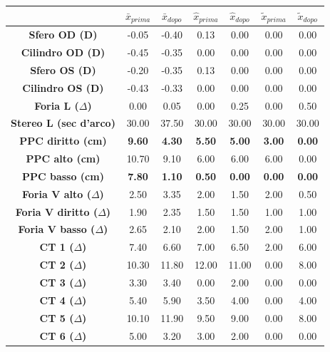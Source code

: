 \begin{table}[H]
\begin{center}
\begin{tabular}{|c|c|c|c|c|c|c|} \hline
{\textbf{}} & {\textbf{$\bar{x}_{prima}$}}} & {\textbf{$\bar{x}_{dopo}$}}& {\textbf{$\hat{x}_{prima}$}}} & {\textbf{$\hat{x}_{dopo}$}}} & {\textbf{$\tilde{x}_{prima}$}}} & {\textbf{$\tilde{x}_{dopo}$}}}\\ \hline
\textbf{Sfero OD (D)} & -0.05 & -0.40 & 0.13 & 0.00 & 0.00 & 0.00 \\ \hline
\textbf{Cilindro OD (D)} & -0.45 & -0.35 & 0.00 & 0.00 & 0.00 & 0.00 \\ \hline
\textbf{Sfero OS (D)} & -0.20 & -0.35 & 0.13 & 0.00 & 0.00 & 0.00 \\ \hline
\textbf{Cilindro OS (D)} & -0.43 & -0.33 & 0.00 & 0.00 & 0.00 & 0.00 \\ \hline
\textbf{Foria L ($\Delta$)} & 0.00 & 0.05 & 0.00 & 0.25 & 0.00 & 0.50 \\ \hline
\textbf{Stereo L (sec d'arco)} & 30.00 & 37.50 & 30.00 & 30.00 & 30.00 & 30.00 \\ \hline
\textbf{PPC diritto (cm)} & \textbf{9.60} & \textbf{4.30} & \textbf{5.50} & \textbf{5.00} & \textbf{3.00} & \textbf{0.00} \\ \hline
\textbf{PPC alto (cm)} & 10.70 & 9.10 & 6.00 & 6.00 & 6.00 & 0.00\\ \hline
\textbf{PPC basso (cm)} & \textbf{7.80} & \textbf{1.10} & \textbf{0.50} & \textbf{0.00} & \textbf{0.00} & \textbf{0.00} \\ \hline
\textbf{Foria V alto ($\Delta$)} & 2.50 & 3.35 & 2.00 & 1.50 & 2.00 & 0.50 \\ \hline
\textbf{Foria V diritto ($\Delta$)} & 1.90 & 2.35 & 1.50 & 1.50 & 1.00 & 1.00 \\ \hline
\textbf{Foria V basso ($\Delta$)} & 2.65 & 2.10 & 2.00 & 1.50 & 2.00 & 1.00 \\ \hline
\textbf{CT 1 ($\Delta$)} & 7.40 & 6.60 & 7.00 & 6.50 & 2.00 & 6.00 \\ \hline
\textbf{CT 2 ($\Delta$)} & 10.30 & 11.80 & 12.00 & 11.00 & 0.00 & 8.00\\ \hline
\textbf{CT 3 ($\Delta$)} & 3.30 & 3.40 & 0.00 & 2.00 & 0.00 & 0.00 \\ \hline
\textbf{CT 4 ($\Delta$)} & 5.40 & 5.90 & 3.50 & 4.00 & 0.00 & 4.00 \\ \hline
\textbf{CT 5 ($\Delta$)} & 10.10 & 11.90 & 9.50 & 9.00 & 0.00 & 8.00 \\ \hline
\textbf{CT 6 ($\Delta$)} & 5.00 & 3.20 & 3.00 & 2.00 & 0.00 & 0.00 \\ \hline

\end{tabular}
\end{center}
\end{table}
